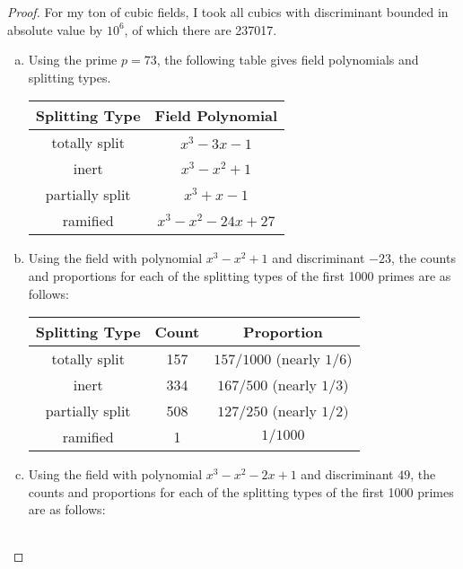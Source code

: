 \documentclass[10pt]{amsart}
\begin{document}
\begin{thm}
  \begin{proof}
    For my ton of cubic fields, I took all cubics with discriminant bounded in absolute value by $10^6$, of which there are 237017.
    \begin{enumerate}[(a)]
    \item
      Using the prime $p = 73$, the following table gives field polynomials and splitting types.
      \begin{center}
        \begin{tabular}{|c|c|}
          \hline
          Splitting Type & Field Polynomial\\
          \hline
          totally split & $x^3 - 3x - 1$\\ 
          \hline
          inert & $x^3 - x^2 + 1$\\ 
          \hline
          partially split & $x^3 + x - 1$\\
          \hline
          ramified & $x^3 - x^2 - 24x + 27$\\
          \hline
        \end{tabular}
      \end{center}
    \item
      Using the field with polynomial $x^3 - x^2 + 1$ and discriminant $-23$, the counts and proportions for each of the splitting types of the first 1000 primes are as follows:
      \begin{center}
        \begin{tabular}{|c|c|c|}
          \hline
          Splitting Type & Count &Proportion\\
          \hline
          totally split & 157 & $157/1000$ (nearly $1/6$)\\ 
          \hline
          inert & 334 &  $167/500$ (nearly $1/3$)\\ 
          \hline
          partially split & 508 & $127/250$ (nearly $1/2)$\\
          \hline
          ramified & 1 & $1/1000$\\
          \hline
        \end{tabular}
      \end{center}
      \item
        Using the field with polynomial $x^3 - x^2 - 2x + 1$ and discriminant $49$, the counts and proportions for each of the splitting types of the first 1000 primes are as follows:
        \begin{center}
        \begin{tabular}{|c|c|c|}
          \hline

\end{tabular}
\end{center}
\end{enumerate}
\end{proof}
\end{thm}
\end{document}
